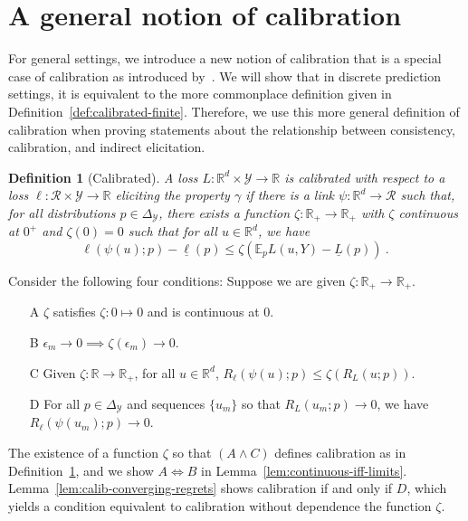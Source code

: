 \documentclass{article}
\newcommand{\reals}{\mathbb{R}}
\newcommand{\simplex}{\Delta_\Y}
\newcommand{\E}{\mathbb{E}}
\newcommand{\R}{\mathcal{R}}
\newcommand{\Y}{\mathcal{Y}}
\newcommand{\exploss}[3]{\E_{#3} #1(#2,Y)}
\newcommand{\risk}[1]{\underline{#1}}
\newtheorem{definition}{Definition}
\begin{document}
\newpage
\appendix
\section{A general notion of calibration}\label{app:calibration}
For general settings, we introduce a new notion of calibration that is a special case of calibration as introduced by~\citet[Chapter 3]{steinwart2008support}.
We will show that in discrete prediction settings, it is equivalent to the more commonplace definition given in Definition~\ref{def:calibrated-finite}.
Therefore, we use this more general definition of calibration when proving statements about the relationship between consistency, calibration, and indirect elicitation.

\begin{definition}[Calibrated]\label{def:calibrated-general}
	A loss $L:\reals^d \times \Y \to \reals$ is \emph{calibrated} with respect to a loss $\ell : \R \times \Y \to \reals$ eliciting the property $\gamma$ if there is a link $\psi : \reals^d \to \R$ such that, for all distributions $p \in \simplex$, there exists a function $\zeta : \reals_+ \to \reals_+$ with $\zeta$ continuous at $0^+$ and $\zeta(0) = 0$ such that for all $u \in \reals^d$, we have
	\begin{equation}\label{eq:calibrated-general}
	\ell( \psi(u); p) - \risk{\ell}(p)  \leq \zeta \left(  \exploss{L}{u}{p} - \risk{L}(p) \right)~.~
	\end{equation}
\end{definition}

Consider the following four conditions: Suppose we are given $\zeta:\reals_+ \to \reals_+$.
\begin{enumerate}
	\item [A] $\zeta$ satisfies $\zeta : 0 \mapsto 0$ and is continuous at $0$.
	\item [B] $\epsilon_m \to 0 \implies \zeta(\epsilon_m) \to 0$.
	\item [C] Given $\zeta:\reals \to \reals_+$, for all $u \in \reals^d$, $R_\ell(\psi(u); p) \leq \zeta(R_L(u;p))$.
	\item [D] For all $p \in \simplex$ and sequences $\{u_m\}$ so that $R_L(u_m; p) \to 0$, we have $R_\ell(\psi(u_m); p) \to 0$.
\end{enumerate}
The existence of a function $\zeta$ so that $(A \wedge C)$ defines calibration as in Definition~\ref{def:calibrated-general}, and we show $A \iff B$ in Lemma~\ref{lem:continuous-iff-limits}.  
Lemma~\ref{lem:calib-converging-regrets} shows calibration if and only if $D$, which yields a condition equivalent to calibration without dependence the function $\zeta$.
\end{document}
